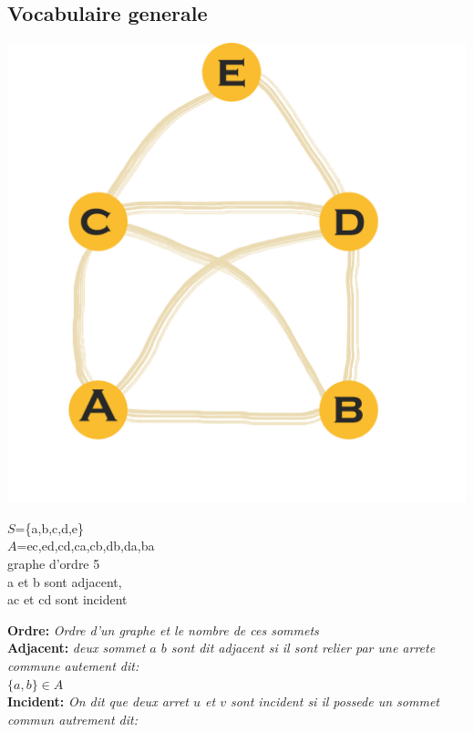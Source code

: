\documentclass[a4paper,11pt]{article}
\begin{document}
        \subsection{Vocabulaire generale}
        \noindent\begin{minipage}{0.3\textwidth}%
  \includegraphics[width=\linewidth]{graphM.png}
  \end{minipage}%
  \hfill%
  \begin{minipage}{0.6\textwidth}\raggedleft
      $S$=\{a,b,c,d,e\}\\
      $A$=ec,ed,cd,ca,cb,db,da,ba\\
      graphe d'ordre 5\\
      a et b sont adjacent,\\ ac et cd sont incident
  \end{minipage}
    \textbf{Ordre:}
    \emph{Ordre d'un graphe et le nombre de ces sommets}
    \\
    \textbf{Adjacent:}
    \emph{deux sommet $a$ $b$ sont dit adjacent si il sont relier par une arrete commune autement dit:}\\
      $\{a, b\}\in A$\\
    \textbf{Incident:}
    \emph{On dit que deux arret $u$ et $v$ sont incident si il possede un sommet commun autrement dit:}\\
\end{document}
